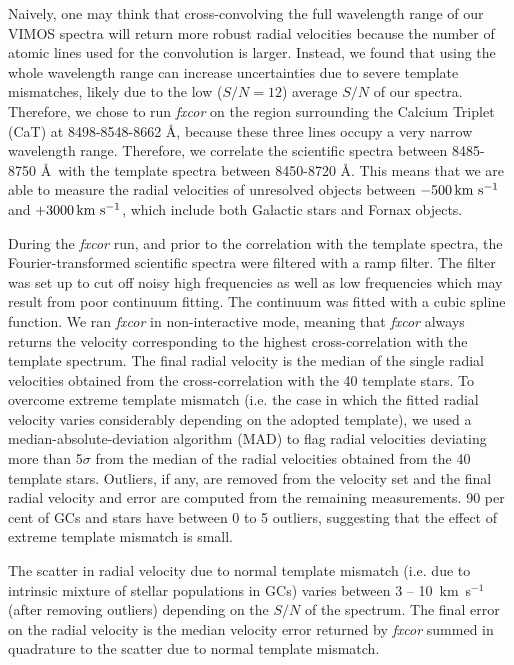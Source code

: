 \documentclass[useAMS,usenatbib]{mn2e}
\newcommand{\kms}{\mbox{\,km~s$^{-1}$}}
\begin{document}
Naively, one may think that cross-convolving the full wavelength range of our 
VIMOS spectra will return more robust radial velocities because the number of 
atomic lines used for the convolution is larger. Instead, we found that using 
the whole wavelength range can increase uncertainties due to severe template 
mismatches, likely due to the low ($S/N = 12$) average $S/N$ of our spectra. 
Therefore, we chose to run {\it fxcor} on the region surrounding the Calcium 
Triplet (CaT) at 8498-8548-8662 \AA , because these three lines occupy a very 
narrow wavelength range. Therefore, we correlate the scientific spectra between 
8485-8750 \AA\ with the template spectra between 8450-8720 \AA . This means 
that we are able to measure the radial velocities of unresolved objects between 
$-500 \kms$ and $+3000\kms$, which include both Galactic stars and Fornax 
objects.   

During the {\it fxcor} run, and prior to the correlation with the template 
spectra, the Fourier-transformed scientific spectra were filtered with a ramp 
filter. The filter was set up to cut off noisy high frequencies as well as low 
frequencies which may result from poor continuum fitting. The continuum was 
fitted with a cubic spline function.
We ran {\it fxcor} in non-interactive mode, meaning that {\it fxcor} always 
returns the velocity corresponding to the highest cross-correlation with the 
template spectrum. The final radial velocity is the median of the single radial 
velocities obtained from the cross-correlation with the 40 template stars. 
To overcome extreme template mismatch (i.e. the case in which the fitted radial 
velocity varies considerably depending on the adopted template), we used a 
median-absolute-deviation algorithm (MAD) to flag radial velocities deviating 
more than 5$\sigma$ from the median of the radial velocities obtained from the 
40 template stars. Outliers, if any, are removed from the velocity set and the 
final radial velocity and error are computed from the remaining measurements. 
90 per cent of GCs and stars have between 0 to 5 outliers, suggesting that the 
effect of extreme template mismatch is small. 

The scatter in radial velocity due to normal template mismatch (i.e. due to 
intrinsic mixture of stellar populations in GCs) varies between 3 -- 10 \kms 
(after removing outliers) depending on the $S/N$ of the spectrum. The final 
error on the radial velocity is the median velocity error returned by {\it 
fxcor} summed in quadrature to the scatter due to normal template mismatch. 
\end{document}
